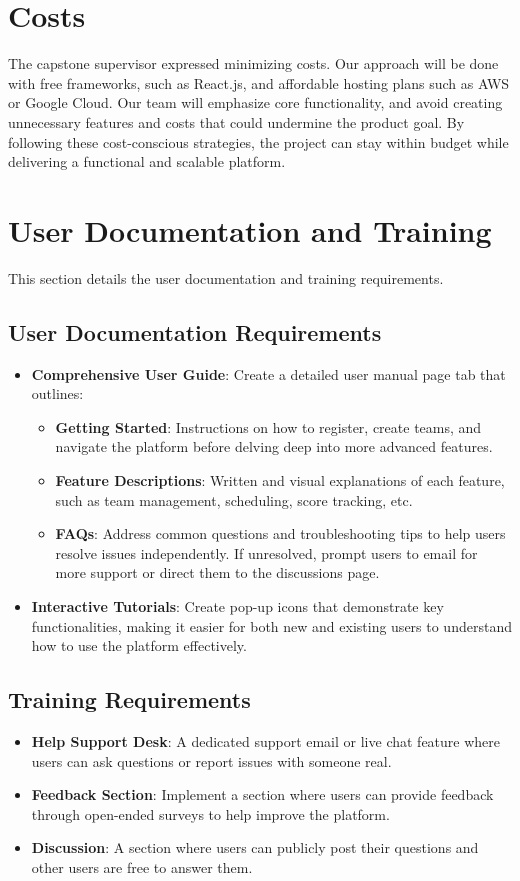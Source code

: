 \documentclass[12pt, titlepage]{article}
\begin{document}
\section{Costs}
The capstone supervisor expressed minimizing costs. Our approach will be done with free frameworks, such as React.js, and affordable hosting plans such as AWS or Google Cloud. Our team will emphasize core functionality, and avoid creating unnecessary features and costs that could undermine the product goal. By following these cost-conscious strategies, the project can stay within budget while delivering a functional and scalable platform.

\section{User Documentation and Training}
This section details the user documentation and training requirements.
\subsection{User Documentation Requirements}
\begin{itemize}
    \item \textbf{Comprehensive User Guide}: Create a detailed user manual page tab that outlines:
    \begin{itemize}
        \item \textbf{Getting Started}: Instructions on how to register, create teams, and navigate the platform before delving deep into more advanced features.
        \item \textbf{Feature Descriptions}: Written and visual explanations of each feature, such as team management, scheduling, score tracking, etc.
        \item \textbf{FAQs}: Address common questions and troubleshooting tips to help users resolve issues independently. If unresolved, prompt users to email for more support or direct them to the discussions page.
    \end{itemize}
    \item \textbf{Interactive Tutorials}: Create pop-up icons that demonstrate key functionalities, making it easier for both new and existing users to understand how to use the platform effectively.
\end{itemize}

\subsection{Training Requirements}
\begin{itemize}
    \item \textbf{Help Support Desk}: A dedicated support email or live chat feature where users can ask questions or report issues with someone real.
    \item \textbf{Feedback Section}: Implement a section where users can provide feedback through open-ended surveys to help improve the platform.
    \item \textbf{Discussion}: A section where users can publicly post their questions and other users are free to answer them.
\end{itemize}
\end{document}

